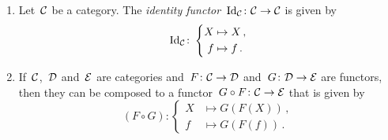 \begin{remark}
  \leavevmode
  \begin{enumerate}
    \item
      Let~$\mathcal{C}$ be a category.
      The \emph{identity functor}~$\mathrm{Id}_{\mathcal{C}} \colon \mathcal{C} \to \mathcal{C}$ is given by
      \[
                \mathrm{Id}_{\mathcal{C}}
        \colon  \left\{
                  \begin{aligned}
                    X &\mapsto  X \,, \\
                    f &\mapsto  f \,.
                  \end{aligned}
                \right.
      \]
    \item
      If~$\mathcal{C}$,~$\mathcal{D}$ and~$\mathcal{E}$ are categories and~$F \colon \mathcal{C} \to \mathcal{D}$ and~$G \colon \mathcal{D} \to \mathcal{E}$ are functors, then they can be composed to a functor~$G \circ F \colon \mathcal{C} \to \mathcal{E}$ that is given by
      \[
                (F \circ G)
        \colon  \left\{
                  \begin{aligned}
                    X &\mapsto  G(F(X)) \,, \\
                    f &\mapsto  G(F(f)) \,.
                  \end{aligned}
                \right.
      \]
  \end{enumerate}
\end{remark}


